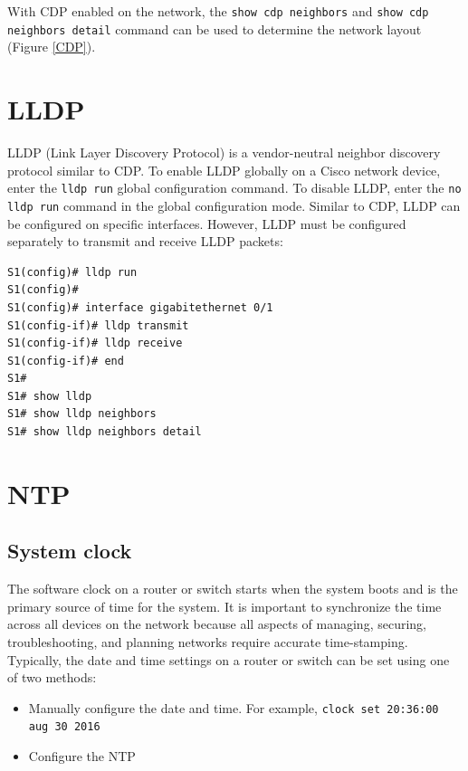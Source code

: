 With CDP enabled on the network, the \verb|show cdp neighbors| and \verb|show cdp neighbors detail| command can be used to determine the network layout (Figure \ref{CDP}).

\section{LLDP}

LLDP (Link Layer Discovery Protocol) is a vendor-neutral neighbor discovery protocol similar to CDP. To enable LLDP globally on a Cisco network device, enter the \verb|lldp run| global configuration command. To disable LLDP, enter the \verb|no lldp run| command in the global configuration mode. Similar to CDP, LLDP can be configured on specific interfaces. However, LLDP must be configured separately to transmit and receive LLDP packets:

\begin{verbatim}
S1(config)# lldp run
S1(config)#
S1(config)# interface gigabitethernet 0/1
S1(config-if)# lldp transmit
S1(config-if)# lldp receive
S1(config-if)# end
S1#
S1# show lldp
S1# show lldp neighbors
S1# show lldp neighbors detail 
\end{verbatim}

\section{NTP}

\subsection{System clock}

The software clock on a router or switch starts when the system boots and is the primary source of time for the system. It is important to synchronize the time across all devices on the network because all aspects of managing, securing, troubleshooting, and planning networks require accurate time-stamping. \\

Typically, the date and time settings on a router or switch can be set using one of two methods: 

\begin{itemize}
\item Manually configure the date and time. For example, \verb|clock set 20:36:00 aug 30 2016|
\item Configure the NTP
\end{itemize}

